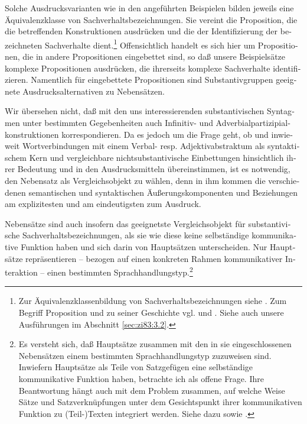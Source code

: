 \documentclass[output=paper]{langscibook}
\begin{document}
\begin{otherlanguage}{german}
\noindent Solche Ausdrucksvarianten wie in den angeführten Beispielen bilden jeweils eine Äquivalenzklasse von Sachverhaltsbezeichnungen. Sie vereint die Proposition, die die betreffenden Konstruktionen ausdrücken und die der Identifizierung der bezeichneten Sachverhalte dient.\footnote{Zur Äquivalenzklassenbildung von Sachverhaltsbezeichnungen siehe \citet[93]{vendler1970say-what-you-think}. Zum Begriff Proposition und zu seiner Geschichte vgl. \citet[Kap. 1]{arutjunova1976ponjatie-propozicii-v-logike-i-lingvistike} und \citet{arutjunova1976predlozenie-i-ego-smysl:-logiko-semanticeskie-problemy}. Siehe auch unsere Ausführungen im Abschnitt \ref{sec:zi83:3.2}.} Offensichtlich handelt es sich hier um Propositionen, die in andere Propositionen eingebettet sind, so daß unsere Beispielsätze komplexe Propositionen ausdrücken, die ihrerseits komplexe Sachverhalte identifizieren. Namentlich für eingebettete Propositionen sind Substantivgruppen geeignete Ausdrucksalternativen zu Nebensätzen.

Wir übersehen nicht, daß mit den uns interessierenden substantivischen Syntagmen unter bestimmten Gegebenheiten auch Infinitiv- und Adverbialpar\-ti\-zi\-pi\-alkonstruktionen korrespondieren. Da es jedoch um die Frage geht, ob und inwieweit Wortverbindungen mit einem Verbal- resp. Adjektivabstraktum als syntaktischem Kern und vergleichbare nichtsubstantivische Einbettungen hinsichtlich ihrer Bedeutung und in den Ausdrucksmitteln übereinstimmen, ist es notwendig, den Nebensatz als Vergleichsobjekt zu wählen, denn in ihm kommen die verschiedenen semantischen und syntaktischen Äußerungskomponenten und Beziehungen am explizitesten und am eindeutigsten zum Ausdruck.

Nebensätze sind auch insofern das geeignetste Vergleichsobjekt für substantivische Sachverhaltsbezeichnungen, als sie wie diese keine selbständige kommunikative Funktion haben und sich darin von Hauptsätzen unterscheiden. Nur Hauptsätze repräsentieren -- 
bezogen auf einen konkreten Rahmen kommunikativer Interaktion -- einen bestimmten Sprachhandlungstyp.\footnote{Es versteht sich, daß Hauptsätze zusammen mit den in sie eingeschlossenen Nebensätzen einem bestimmten Sprachhandlungstyp zuzuweisen sind. Inwiefern Hauptsätze als Teile von Satzgefügen eine selbständige kommunikative Funktion haben, betrachte ich als offene Frage. Ihre Beantwortung hängt auch mit dem Problem zusammen, auf welche Weise Sätze und Satzverknüpfungen unter dem Gesichtspunkt ihrer kommunikativen Funktion zu (Teil-)Texten integriert werden. Siehe dazu \citet{motsch1981sprachhandlung-satz-und-text} sowie \citet{viehweger1983sequenzierung-von-sprachhandlungen-und-prinzipien-der-einheitenbildung-im-text}.} 


\end{otherlanguage}
\end{document}
